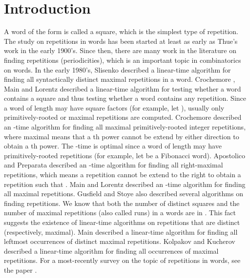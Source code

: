 \documentclass{article}
\begin{document}
\section{Introduction}
A word of the form  is called a square, which is the simplest
type of repetition. The study on repetitions in words has been
started at least as early as Thue's work \cite{Thue1906} in the
early 1900's. Since then, there are many work in the literature on
finding repetitions (periodicities), which is an important topic in
combinatorics on words. In the early 1980's, Slisenko
\cite{Slisenko1983} described a linear-time algorithm for finding
all syntactically distinct maximal repetitions in a word. Crochemore
\cite{Crochemore1983}, Main and Lorentz \cite{Main&Lorentz1985}
described a linear-time algorithm for testing whether a word
contains a square and thus testing whether a word contains any
repetition. Since a word  of length  may have 
square factors (for example, let ), usually only
primitively-rooted or maximal repetitions are computed. Crochemore
\cite{Crochemore1981} described an -time algorithm for
finding all maximal primitively-rooted integer repetitions, where
maximal means that a th power cannot be extend by either
direction to obtain a th power. The -time is
optimal since a word  of length  may have 
primitively-rooted repetitions (for example, let  be a Fibonacci
word). Apostolico and Preparata \cite{Apostolico&Preparata1983}
described an -time algorithm for finding all
right-maximal repetitions, which means a repetition  cannot be
extend to the right to obtain a repetition  such that
. Main and Lorentz \cite{Main&Lorentz1984}
described an -time algorithm for finding all maximal
repetitions. Gusfield and Stoye
\cite{Stoye&Gusfield1998,Gusfield&Stoye2004} also described several algorithms on finding repetitions. We know
that both the number of distinct squares \cite{Fraenkel&Simpson1998}
and the number of maximal repetitions (also called runs)
\cite{Kolpakov&Kucherov1999} in a words are in . This fact
suggests the existence of linear-time algorithms on repetitions that
are distinct (respectively, maximal). Main \cite{Main1989} described
a linear-time algorithm for finding all leftmost occurrences of
distinct maximal repetitions. Kolpakov and Kucherov
\cite{Kolpakov&Kucherov1999} described a linear-time algorithm for
finding all occurrences of maximal repetitions. For a most-recently
survey on the topic of repetitions in words, see the paper
\cite{Crochemore&Ilie&Rytter2009}.
\end{document}
